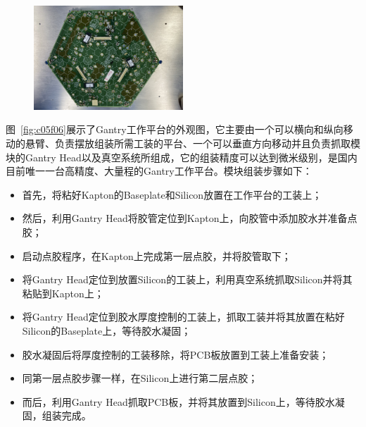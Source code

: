 \begin{figure}[!htbp]
    \centering
    \includegraphics[width=0.5\textwidth]{figures/chapter05/HGCal_sample.jpeg}
    \label{fig:c05f05}
\end{figure}

图~\ref{fig:c05f06}展示了Gantry工作平台的外观图，它主要由一个可以横向和纵向移动的悬臂、负责摆放组装所需工装的平台、一个可以垂直方向移动并且负责抓取模块的Gantry Head以及真空系统所组成，它的组装精度可以达到微米级别，是国内目前唯一一台高精度、大量程的Gantry工作平台。模块组装步骤如下：
\begin{itemize}
    \item 首先，将粘好Kapton的Baseplate和Silicon放置在工作平台的工装上；
    \item 然后，利用Gantry Head将胶管定位到Kapton上，向胶管中添加胶水并准备点胶；
    \item 启动点胶程序，在Kapton上完成第一层点胶，并将胶管取下；
    \item 将Gantry Head定位到放置Silicon的工装上，利用真空系统抓取Silicon并将其粘贴到Kapton上；
    \item 将Gantry Head定位到胶水厚度控制的工装上，抓取工装并将其放置在粘好Silicon的Baseplate上，等待胶水凝固；
    \item 胶水凝固后将厚度控制的工装移除，将PCB板放置到工装上准备安装；
    \item 同第一层点胶步骤一样，在Silicon上进行第二层点胶；
    \item 而后，利用Gantry Head抓取PCB板，并将其放置到Silicon上，等待胶水凝固，组装完成。
\end{itemize}

